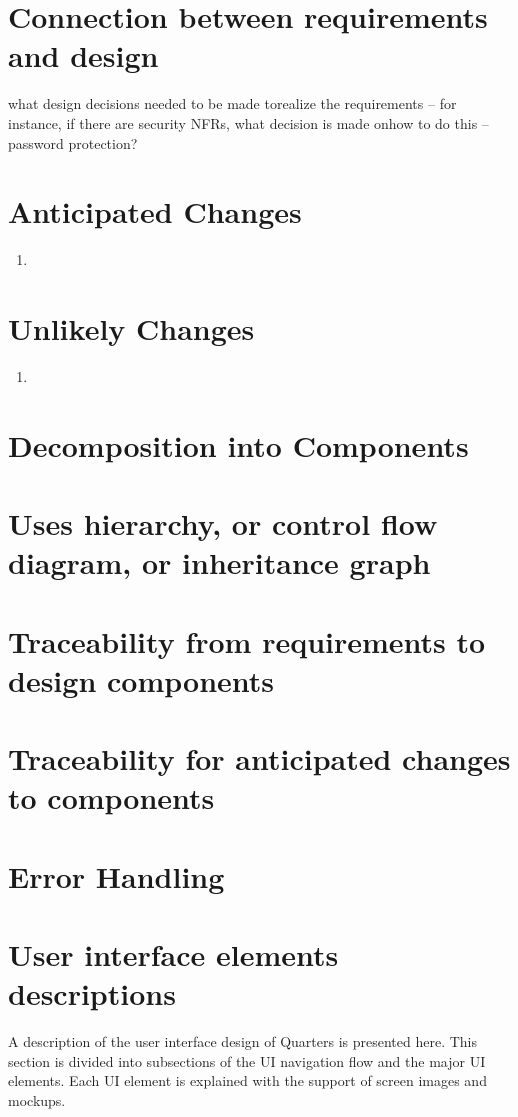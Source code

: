 \documentclass[12pt]{article}
\begin{document}
\section{Connection between requirements and design}
what design decisions needed to be made torealize the requirements – for instance, if there are security NFRs, what decision is made onhow to do this – password protection?

\section{Anticipated Changes}
\begin{enumerate}
\item{}
\end{enumerate}

\section{Unlikely Changes}
\begin{enumerate}
\item{}
\end{enumerate}

%
\section{Decomposition into Components}

%
\section{Uses hierarchy, or control flow diagram, or inheritance graph}

%
\section{Traceability from requirements to design components}

%
\section{Traceability for anticipated changes to components}
	
%
\section{Error Handling}

%
\section{User interface elements descriptions}
A description of the user interface design of Quarters is presented here. This section is divided into subsections of the UI navigation flow and the major UI elements. Each UI element is explained with the support of screen images and mockups.
\end{document}
